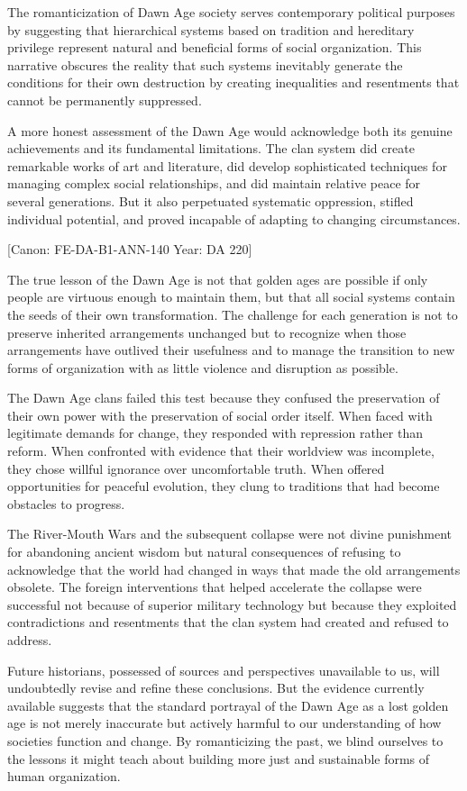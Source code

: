 The romanticization of Dawn Age society serves contemporary political
purposes by suggesting that hierarchical systems based on tradition and
hereditary privilege represent natural and beneficial forms of social
organization. This narrative obscures the reality that such systems
inevitably generate the conditions for their own destruction by creating
inequalities and resentments that cannot be permanently suppressed.

A more honest assessment of the Dawn Age would acknowledge both its
genuine achievements and its fundamental limitations. The clan system
did create remarkable works of art and literature, did develop
sophisticated techniques for managing complex social relationships, and
did maintain relative peace for several generations. But it also
perpetuated systematic oppression, stifled individual potential, and
proved incapable of adapting to changing circumstances.

{[}Canon: FE-DA-B1-ANN-140 \textbar{} Year: DA 220{]}

The true lesson of the Dawn Age is not that golden ages are possible if
only people are virtuous enough to maintain them, but that all social
systems contain the seeds of their own transformation. The challenge for
each generation is not to preserve inherited arrangements unchanged but
to recognize when those arrangements have outlived their usefulness and
to manage the transition to new forms of organization with as little
violence and disruption as possible.

The Dawn Age clans failed this test because they confused the
preservation of their own power with the preservation of social order
itself. When faced with legitimate demands for change, they responded
with repression rather than reform. When confronted with evidence that
their worldview was incomplete, they chose willful ignorance over
uncomfortable truth. When offered opportunities for peaceful evolution,
they clung to traditions that had become obstacles to progress.

The River-Mouth Wars and the subsequent collapse were not divine
punishment for abandoning ancient wisdom but natural consequences of
refusing to acknowledge that the world had changed in ways that made the
old arrangements obsolete. The foreign interventions that helped
accelerate the collapse were successful not because of superior military
technology but because they exploited contradictions and resentments
that the clan system had created and refused to address.

Future historians, possessed of sources and perspectives unavailable to
us, will undoubtedly revise and refine these conclusions. But the
evidence currently available suggests that the standard portrayal of the
Dawn Age as a lost golden age is not merely inaccurate but actively
harmful to our understanding of how societies function and change. By
romanticizing the past, we blind ourselves to the lessons it might teach
about building more just and sustainable forms of human organization.

